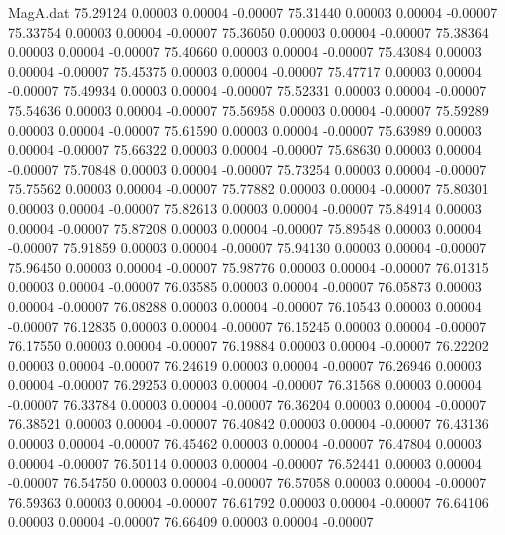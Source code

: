 \begin{filecontents}{MagA.dat}
  75.29124    0.00003    0.00004   -0.00007
  75.31440    0.00003    0.00004   -0.00007
  75.33754    0.00003    0.00004   -0.00007
  75.36050    0.00003    0.00004   -0.00007
  75.38364    0.00003    0.00004   -0.00007
  75.40660    0.00003    0.00004   -0.00007
  75.43084    0.00003    0.00004   -0.00007
  75.45375    0.00003    0.00004   -0.00007
  75.47717    0.00003    0.00004   -0.00007
  75.49934    0.00003    0.00004   -0.00007
  75.52331    0.00003    0.00004   -0.00007
  75.54636    0.00003    0.00004   -0.00007
  75.56958    0.00003    0.00004   -0.00007
  75.59289    0.00003    0.00004   -0.00007
  75.61590    0.00003    0.00004   -0.00007
  75.63989    0.00003    0.00004   -0.00007
  75.66322    0.00003    0.00004   -0.00007
  75.68630    0.00003    0.00004   -0.00007
  75.70848    0.00003    0.00004   -0.00007
  75.73254    0.00003    0.00004   -0.00007
  75.75562    0.00003    0.00004   -0.00007
  75.77882    0.00003    0.00004   -0.00007
  75.80301    0.00003    0.00004   -0.00007
  75.82613    0.00003    0.00004   -0.00007
  75.84914    0.00003    0.00004   -0.00007
  75.87208    0.00003    0.00004   -0.00007
  75.89548    0.00003    0.00004   -0.00007
  75.91859    0.00003    0.00004   -0.00007
  75.94130    0.00003    0.00004   -0.00007
  75.96450    0.00003    0.00004   -0.00007
  75.98776    0.00003    0.00004   -0.00007
  76.01315    0.00003    0.00004   -0.00007
  76.03585    0.00003    0.00004   -0.00007
  76.05873    0.00003    0.00004   -0.00007
  76.08288    0.00003    0.00004   -0.00007
  76.10543    0.00003    0.00004   -0.00007
  76.12835    0.00003    0.00004   -0.00007
  76.15245    0.00003    0.00004   -0.00007
  76.17550    0.00003    0.00004   -0.00007
  76.19884    0.00003    0.00004   -0.00007
  76.22202    0.00003    0.00004   -0.00007
  76.24619    0.00003    0.00004   -0.00007
  76.26946    0.00003    0.00004   -0.00007
  76.29253    0.00003    0.00004   -0.00007
  76.31568    0.00003    0.00004   -0.00007
  76.33784    0.00003    0.00004   -0.00007
  76.36204    0.00003    0.00004   -0.00007
  76.38521    0.00003    0.00004   -0.00007
  76.40842    0.00003    0.00004   -0.00007
  76.43136    0.00003    0.00004   -0.00007
  76.45462    0.00003    0.00004   -0.00007
  76.47804    0.00003    0.00004   -0.00007
  76.50114    0.00003    0.00004   -0.00007
  76.52441    0.00003    0.00004   -0.00007
  76.54750    0.00003    0.00004   -0.00007
  76.57058    0.00003    0.00004   -0.00007
  76.59363    0.00003    0.00004   -0.00007
  76.61792    0.00003    0.00004   -0.00007
  76.64106    0.00003    0.00004   -0.00007
  76.66409    0.00003    0.00004   -0.00007

\end{filecontents}
